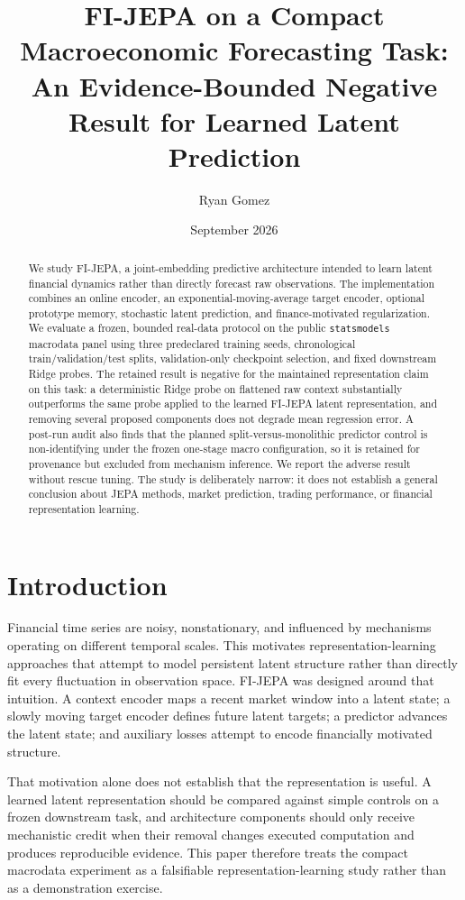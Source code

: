 \documentclass[11pt]{article}
\title{FI-JEPA on a Compact Macroeconomic Forecasting Task:\\An Evidence-Bounded Negative Result for Learned Latent Prediction}
\author{Ryan Gomez}
\date{September 2026}
\begin{document}
\maketitle

\begin{abstract}
We study FI-JEPA, a joint-embedding predictive architecture intended to learn latent financial dynamics rather than directly forecast raw observations. The implementation combines an online encoder, an exponential-moving-average target encoder, optional prototype memory, stochastic latent prediction, and finance-motivated regularization. We evaluate a frozen, bounded real-data protocol on the public \texttt{statsmodels} macrodata panel using three predeclared training seeds, chronological train/validation/test splits, validation-only checkpoint selection, and fixed downstream Ridge probes. The retained result is negative for the maintained representation claim on this task: a deterministic Ridge probe on flattened raw context substantially outperforms the same probe applied to the learned FI-JEPA latent representation, and removing several proposed components does not degrade mean regression error. A post-run audit also finds that the planned split-versus-monolithic predictor control is non-identifying under the frozen one-stage macro configuration, so it is retained for provenance but excluded from mechanism inference. We report the adverse result without rescue tuning. The study is deliberately narrow: it does not establish a general conclusion about JEPA methods, market prediction, trading performance, or financial representation learning.
\end{abstract}

\section{Introduction}
Financial time series are noisy, nonstationary, and influenced by mechanisms operating on different temporal scales. This motivates representation-learning approaches that attempt to model persistent latent structure rather than directly fit every fluctuation in observation space. FI-JEPA was designed around that intuition. A context encoder maps a recent market window into a latent state; a slowly moving target encoder defines future latent targets; a predictor advances the latent state; and auxiliary losses attempt to encode financially motivated structure.

That motivation alone does not establish that the representation is useful. A learned latent representation should be compared against simple controls on a frozen downstream task, and architecture components should only receive mechanistic credit when their removal changes executed computation and produces reproducible evidence. This paper therefore treats the compact macrodata experiment as a falsifiable representation-learning study rather than as a demonstration exercise.
\end{document}
